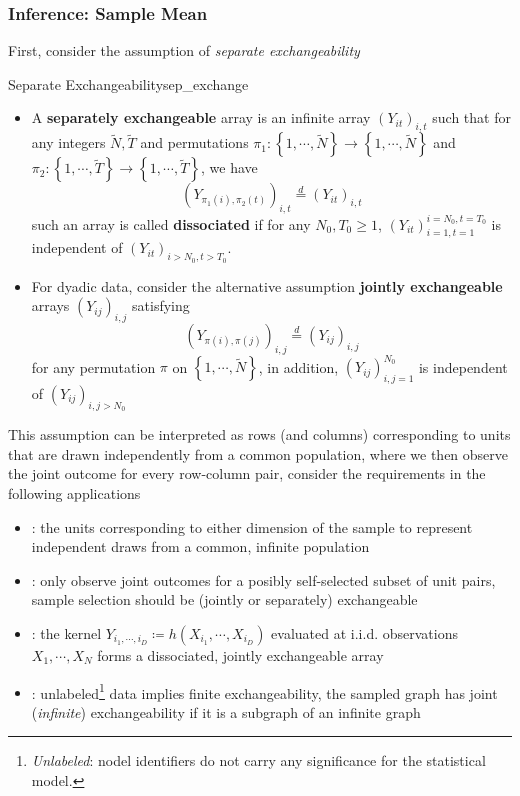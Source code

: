 \documentclass[twoside]{article}
\begin{document}
\subsubsection{Inference: Sample Mean}
First, consider the assumption of \textit{separate exchangeability}
\begin{assumption}{Separate Exchangeability}{sep_exchange}
    \begin{itemize}
        \item A \textbf{separately exchangeable} array is an infinite array $\left(Y_{it}\right)_{i,t}$ such that for any integers $\tilde{N},\tilde{T}$ and permutations $\pi_1:\left\{1,\cdots,\tilde{N}\right\}\rightarrow \left\{1,\cdots,\tilde{N}\right\}$ and $\pi_2:\left\{1,\cdots,\tilde{T}\right\}\rightarrow \left\{1,\cdots,\tilde{T}\right\}$, we have 
        $$ \left(Y_{\pi_1(i),\pi_2(t)}\right)_{i,t} \overset{d}{=} \left(Y_{it}\right)_{i,t} $$
        such an array is called \textbf{dissociated} if for any $N_0,T_0\geq 1$, $\left(Y_{it}\right)^{i=N_0,t=T_0}_{i=1,t=1}$ is independent of $\left(Y_{it}\right)_{i>N_0,t>T_0}$.
        \item For dyadic data, consider the alternative assumption \textbf{jointly exchangeable} arrays $\left(Y_{ij}\right)_{i,j}$ satisfying 
        $$ \left(Y_{\pi(i),\pi(j)}\right)_{i,j} \overset{d}{=} \left(Y_{ij}\right)_{i,j} $$
        for any permutation $\pi$ on $\left\{1,\cdots,\tilde{N}\right\}$, in addition, $\left(Y_{ij}\right)^{N_0}_{i,j=1}$ is independent of $\left(Y_{ij}\right)_{i,j>N_0}$
    \end{itemize}
\end{assumption}
This assumption can be interpreted as rows (and columns) corresponding to units that are drawn independently from a common population, where we then observe the joint outcome for every row-column pair, consider the requirements in the following applications
\begin{itemize}
    \item {}: the units corresponding to either dimension of the sample to represent independent draws from a common, infinite population 
    \item {}: only observe joint outcomes for a posibly self-selected subset of unit pairs, sample selection should be (jointly or separately) exchangeable
    \item {}: the kernel $Y_{i_1,\cdots,i_D} \coloneq h\left(X_{i_1},\cdots,X_{i_D}\right) $ evaluated at i.i.d. observations $X_1,\cdots,X_N$ forms a dissociated, jointly exchangeable array
    \item {}: unlabeled\footnote{\textit{Unlabeled}: nodel identifiers do not carry any significance for the statistical model.} data implies finite exchangeability, the sampled graph has joint (\textit{infinite}) exchangeability if it is a subgraph of an infinite graph
\end{itemize}
\end{document}
